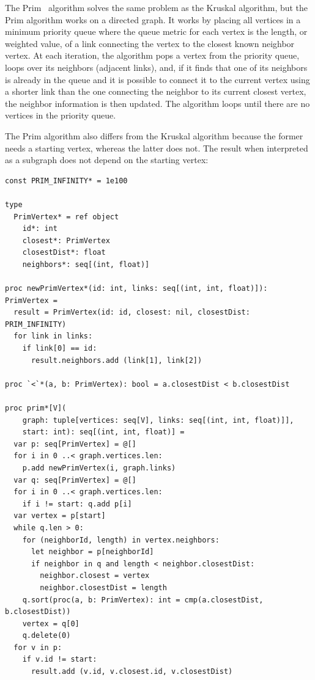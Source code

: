 \documentclass[justified, sixbynine]{tufte-book}
\def\ft{\small\tt}
\theoremstyle{plain}%
\newtheorem * {corollary}{Corollary}
\theoremstyle{definition}
\theoremstyle{remark}
\newtheorem * {remark}{Remark}
\newtheorem * {note}{Note}
\begin{document}
\begin{fullwidth}
The Prim~\cite{prim} algorithm solves the same problem as the Kruskal algorithm, but the Prim algorithm works on a directed graph. It works by placing all vertices in a minimum priority queue where the queue metric for each vertex is the length, or weighted value, of a link connecting the vertex to the closest known neighbor vertex. At each iteration, the algorithm pops a vertex from the priority queue, loops over its neighbors (adjacent links), and, if it finds that one of its neighbors is already in the queue and it is possible to connect it to the current vertex using a shorter link than the one connecting the neighbor to its current closest vertex, the neighbor information is then updated. The algorithm loops until there are no vertices in the priority queue.

The Prim algorithm also differs from the Kruskal algorithm because the former needs a starting vertex, whereas the latter does not. The result when interpreted as a subgraph does not depend on the starting vertex:

\begin{lstlisting}[caption={in file: {\ft nlib/graph.nim}}]
const PRIM_INFINITY* = 1e100

type
  PrimVertex* = ref object
    id*: int
    closest*: PrimVertex
    closestDist*: float
    neighbors*: seq[(int, float)]

proc newPrimVertex*(id: int, links: seq[(int, int, float)]): PrimVertex =
  result = PrimVertex(id: id, closest: nil, closestDist: PRIM_INFINITY)
  for link in links:
    if link[0] == id:
      result.neighbors.add (link[1], link[2])

proc `<`*(a, b: PrimVertex): bool = a.closestDist < b.closestDist

proc prim*[V](
    graph: tuple[vertices: seq[V], links: seq[(int, int, float)]],
    start: int): seq[(int, int, float)] =
  var p: seq[PrimVertex] = @[]
  for i in 0 ..< graph.vertices.len:
    p.add newPrimVertex(i, graph.links)
  var q: seq[PrimVertex] = @[]
  for i in 0 ..< graph.vertices.len:
    if i != start: q.add p[i]
  var vertex = p[start]
  while q.len > 0:
    for (neighborId, length) in vertex.neighbors:
      let neighbor = p[neighborId]
      if neighbor in q and length < neighbor.closestDist:
        neighbor.closest = vertex
        neighbor.closestDist = length
    q.sort(proc(a, b: PrimVertex): int = cmp(a.closestDist, b.closestDist))
    vertex = q[0]
    q.delete(0)
  for v in p:
    if v.id != start:
      result.add (v.id, v.closest.id, v.closestDist)
\end{lstlisting}


\end{fullwidth}
\end{document}
